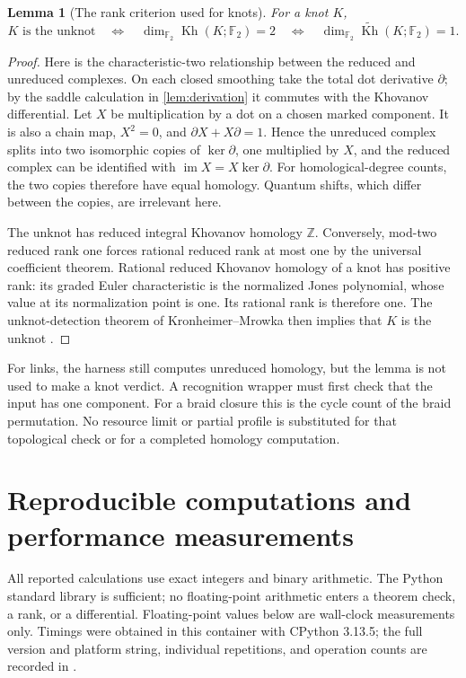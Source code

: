 \documentclass[11pt,letterpaper]{article}
\newtheorem{lemma}[theorem]{Lemma}
\theoremstyle{definition}
\theoremstyle{remark}
\newcommand{\F}{\mathbb F_2}
\newcommand{\Kh}{\operatorname{Kh}}
\newcommand{\rKh}{\widetilde{\operatorname{Kh}}}
\newcommand{\code}[1]{\texttt{\detokenize{#1}}}
\begin{document}
\begin{lemma}[The rank criterion used for knots]\label{lem:detect}
For a knot $K$,
\[
 K\text{ is the unknot}\quad\Longleftrightarrow\quad
 \dim_{\F}\Kh(K;\F)=2
 \quad\Longleftrightarrow\quad\dim_{\F}\rKh(K;\F)=1.
\]
\end{lemma}
\begin{proof}
Here is the characteristic-two relationship between the reduced and unreduced
complexes. On each closed smoothing take the total dot derivative
$\partial$; by the saddle calculation in \cref{lem:derivation} it commutes
with the Khovanov differential. Let $X$ be multiplication by a dot on a chosen
marked component. It is also a chain map, $X^2=0$, and
$\partial X+X\partial=1$. Hence the unreduced complex splits into two
isomorphic copies of $\ker\partial$, one multiplied by $X$, and the reduced
complex can be identified with $\operatorname{im}X=X\ker\partial$.
For homological-degree counts, the two copies therefore have equal homology.
Quantum shifts, which differ between the copies, are irrelevant here.

The unknot has reduced integral Khovanov homology $\mathbb Z$. Conversely,
mod-two reduced rank one forces rational reduced rank at most one by the
universal coefficient theorem. Rational reduced Khovanov homology of a knot
has positive rank: its graded Euler characteristic is the normalized Jones
polynomial, whose value at its normalization point is one. Its rational rank
is therefore one. The unknot-detection theorem of Kronheimer--Mrowka then
implies that $K$ is the unknot \cite{km}.
\end{proof}

For links, the harness still computes unreduced homology, but the lemma is not
used to make a knot verdict. A recognition wrapper must first check that the
input has one component. For a braid closure this is the cycle count of the
braid permutation. No resource limit or partial profile is substituted for
that topological check or for a completed homology computation.

\section{Reproducible computations and performance measurements}
\label{sec:experiments}
All reported calculations use exact integers and binary arithmetic. The Python
standard library is sufficient; no floating-point arithmetic enters a theorem
check, a rank, or a differential. Floating-point values below are wall-clock
measurements only. Timings were obtained in this container with CPython 3.13.5;
the full version and platform string, individual repetitions, and operation
counts are recorded in \code{results/benchmark.json}.
\end{document}
